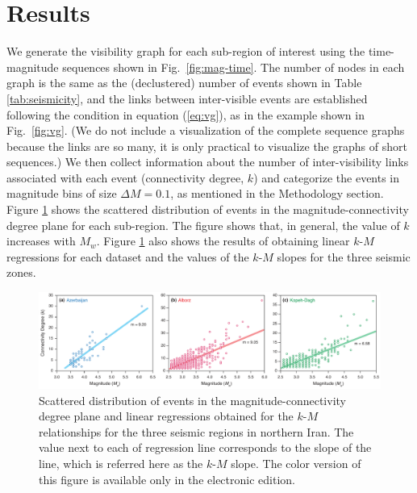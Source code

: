 
\section{Results}

We generate the visibility graph for each sub-region of interest using the time-magnitude sequences shown in Fig.~\ref{fig:mag-time}. The number of nodes in each graph is the same as the (declustered) number of events shown in Table \ref{tab:seismicity}, and the links between inter-visible events are established following the condition in equation (\ref{eq:vg}), as in the example shown in Fig.~\ref{fig:vg}. (We do not include a visualization of the complete sequence graphs because the links are so many, it is only practical to visualize the graphs of short sequences.) We then collect information about the number of inter-visibility links associated with each event (connectivity degree, $k$) and categorize the events in magnitude bins of size $\Delta M = 0.1$, as mentioned in the Methodology section. Figure \ref{fig:km} shows the scattered distribution of events in the magnitude-connectivity degree plane for each sub-region. The figure shows that, in general, the value of $k$ increases with $M_w$. Figure \ref{fig:km} also shows the results of obtaining linear $k$-$M$ regressions for each dataset and the values of the $k$-$M$ slopes for the three seismic zones.

\begin{figure}[t]
	\centering
	\includegraphics[width=\textwidth]{figures/pdf/figure-06} 
	\caption{Scattered distribution of events in the magnitude-connectivity degree plane and linear regressions obtained for the $k$-$M$ relationships for the three seismic regions in northern Iran. The value next to each of regression line corresponds to the slope of the line, which is referred here as the $k$-$M$ slope. The color version of this figure is available only in the electronic edition.}
	\label{fig:km}
\end{figure}

